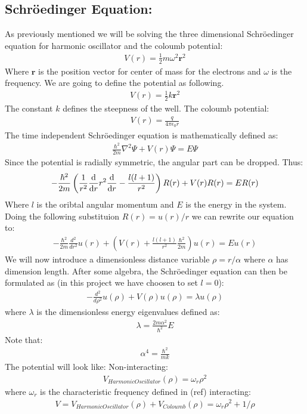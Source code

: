 \documentclass[a4paper, 10pt]{article}
\begin{document}
\subsection{Schröedinger Equation:} As previously mentioned we will be solving the
three dimensional Schröedinger equation for harmonic oscillator and the coloumb potential:
\begin{align}
  V(r) = \frac{1}{2}m\omega^{2}\mathbf{r}^{2}
\end{align}
Where $\mathbf{r}$ is the position vector for center of mass for the electrons and
$\omega$ is the frequency. We are going to define the potential as following.
\begin{align}
  V(r) = \frac{1}{2}k\mathbf{r}^{2}
\end{align}
The constant $k$ defines the steepness of the well. The coloumb potential:
\begin{align}
  V(r) = \frac{q}{4\pi \epsilon_{0}r}
\end{align}
The time independent
Schröedinger equation is mathematically defined as:
\begin{align}
  \frac{\hbar^{2}}{2m}\nabla^{2}\Psi + V(r)\Psi = E\Psi
\end{align}
Since the potential is radially symmetric, the angular part can be dropped.
Thus:
\begin{align}
  -\frac{\hbar^{2}}{2m}\left(\frac{1}{r^{2}}\dv{r}r^{2}\dv{r} -
  \frac{l(l+1)}{r^{2}}\right)R(r) + V(r)R(r) = ER(r)
\end{align}
Where $l$ is the oribtal angular momentum and $E$ is the energy in the system.
Doing the following substituion $R(r) = u(r)/r$ we can rewrite our equation to:
\begin{align}
  -\frac{\hbar^2}{2m}
  \frac{d^2}{dr^2}u(r)+\left(V(r)+
  \frac{l(l+1)}{r^2}\frac{\hbar^2}{2m}\right)u(r)=Eu(r)
\end{align}
We will now introduce a dimensionless distance variable $\rho = r/\alpha$ where
$\alpha$ has dimension length. After some algebra, the Schröedinger equation can then be formulated as
(in this project we have choosen to set $l = 0$):
\begin{align}
  -\frac{d^2}{d\rho^2}u(\rho)+V(\rho)u(\rho)=\lambda u(\rho)
\end{align}
where $\lambda$ is the dimensionless energy eigenvalues defined as:
\begin{align}
  \lambda = \frac{2m\alpha^{2}}{\hbar^{2}}E
\end{align}
Note that:
\begin{align}
  \alpha^{4} = \frac{\hbar^{2}}{mk}
\end{align}
The potential will look like:
Non-interacting:
\begin{align}
  V_{HarmonicOscillator}(\rho) = \omega_{r}\rho^{2}
\end{align}
where $\omega_{r}$ is the characteristic frequency defined in (ref)
interacting:
\begin{align}
  V = V_{HarmonicOscillator}(\rho) +   V_{Coloumb}(\rho) = \omega_{r}\rho^{2} + 1/\rho
\end{align}
\end{document}
